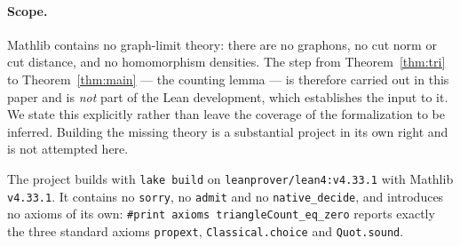 \documentclass[11pt]{article}
\theoremstyle{plain}
\theoremstyle{remark}
\begin{document}
\paragraph{Scope.} Mathlib contains no graph-limit theory: there are no
graphons, no cut norm or cut distance, and no homomorphism densities. The step
from Theorem~\ref{thm:tri} to Theorem~\ref{thm:main} --- the counting lemma
--- is therefore carried out in this paper and is \emph{not} part of the Lean
development, which establishes the input to it. We state this explicitly rather
than leave the coverage of the formalization to be inferred. Building the
missing theory is a substantial project in its own right and is not attempted
here.

The project builds with \texttt{lake build} on
\texttt{leanprover/lean4:v4.33.1} with Mathlib \texttt{v4.33.1}. It contains no
\texttt{sorry}, no \texttt{admit} and no \texttt{native\_decide}, and
introduces no axioms of its own:
\texttt{\#print axioms triangleCount\_eq\_zero} reports exactly the three
standard axioms \texttt{propext}, \texttt{Classical.choice} and
\texttt{Quot.sound}.
\end{document}
